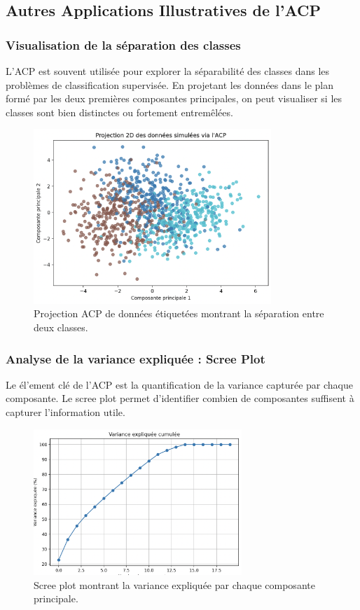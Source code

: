 \documentclass[a4paper,12pt]{report}
\begin{document}
\subsection{Autres Applications Illustratives de l’ACP}

\subsubsection{Visualisation de la s\'eparation des classes}
L'ACP est souvent utilis\'ee pour explorer la s\'eparabilit\'e des classes dans les probl\`emes de classification supervis\'ee. En projetant les donn\'ees dans le plan form\'e par les deux premi\`eres composantes principales, on peut visualiser si les classes sont bien distinctes ou fortement entrem\^el\'ees.

\begin{figure}
  \centering
  \includegraphics[width=0.8\textwidth]{separation_classes.png}   
  \caption{Projection ACP de donn\'ees \'etiquet\'ees montrant la s\'eparation entre deux classes.}
  \label{fig:separation_classes}
\end{figure}

\subsubsection{Analyse de la variance expliqu\'ee : Scree Plot}
Le \'el'ement cl\'e de l'ACP est la quantification de la variance captur\'ee par chaque composante. Le scree plot permet d'identifier combien de composantes suffisent \`a capturer l'information utile.

\begin{figure}[h!]
  \centering
  \includegraphics[width=0.7\textwidth]{scree_plot.png}   
  \caption{Scree plot montrant la variance expliqu\'ee par chaque composante principale.}
  \label{fig:scree_plot}
\end{figure}
\end{document}
